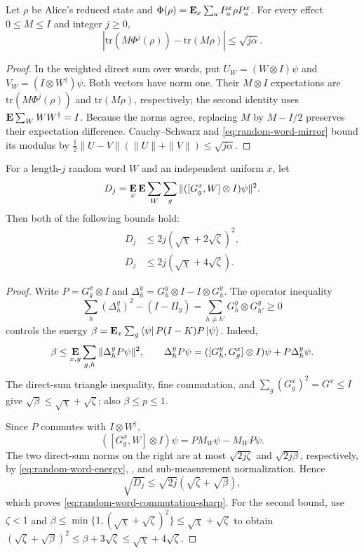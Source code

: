 \documentclass[11pt]{article}
\theoremstyle{definition}
\newcommand{\E}{\mathop{\bf E\/}}
\newcommand{\tr}{\mathrm{tr}} \newcommand{\Tr}{\tr}
\begin{document}
\begin{lemma}\label{lem:sequential-bot-marginal}
Let $\rho$ be Alice's reduced state and
$\Phi(\rho)=\E_x\sum_aP_a^x\rho P_a^x$.
For every effect $0\leq M\leq I$ and integer $j\geq0$,
\begin{equation}\label{eq:pasting-marginal-stability}
 |\tr(M\Phi^j(\rho))-\tr(M\rho)|\leq\sqrt{j\alpha}.
\end{equation}
\end{lemma}
\begin{proof}
In the weighted direct sum over words, put
$U_W=(W\otimes I)\psi$ and $V_W=(I\otimes W^\dagger)\psi$.
Both vectors have norm one.  Their $M\otimes I$ expectations are
$\tr(M\Phi^j(\rho))$ and $\tr(M\rho)$, respectively; the second
identity uses $\E\sum_WWW^\dagger=I$.
Because the norms agree, replacing $M$ by $M-I/2$ preserves their
expectation difference.  Cauchy--Schwarz and
\eqref{eq:random-word-mirror} bound its modulus by
$\tfrac12\|U-V\|(\|U\|+\|V\|)\leq\sqrt{j\alpha}$.
\end{proof}

\begin{lemma}\label{lem:commute-g-half-sandwich}
For a length-$j$ random word $W$ and an independent uniform $x$, let
\[
 D_j=\E_x\E\sum_W\sum_g
       \|([G_g^x,W]\otimes I)\psi\|^2.
\]
Then both of the following bounds hold:
\begin{align}
 D_j&\leq2j(\sqrt\chi+2\sqrt\zeta)^2,
       \label{eq:random-word-commutation-sharp}\\
 D_j&\leq2j(\sqrt\chi+4\sqrt\zeta).
       \label{eq:random-word-commutation}
\end{align}
\end{lemma}
\begin{proof}
Write $P=G_g^x\otimes I$ and $\Delta_h^y=G_h^y\otimes I-I\otimes G_h^y$.
The operator inequality
\[
 \sum_h(\Delta_h^y)^2-(I-\Pi_y)
 =\sum_{h\ne h'}G_h^y\otimes G_{h'}^y\geq0
\]
controls the energy
$\beta=\E_x\sum_g\bra\psi P(I-K)P\ket\psi$.
Indeed,
\[
 \beta\leq\E_{x,y}\sum_{g,h}\|\Delta_h^yP\psi\|^2,
 \qquad
 \Delta_h^yP\psi
 =([G_h^y,G_g^x]\otimes I)\psi+P\Delta_h^y\psi.
\]
The direct-sum triangle inequality, fine commutation, and
$\sum_g(G_g^x)^2=G^x\leq I$ give
$\sqrt\beta\leq\sqrt\chi+\sqrt\zeta$; also $\beta\leq p\leq1$.

Since $P$ commutes with $I\otimes W^\dagger$,
\[
 ([G_g^x,W]\otimes I)\psi=PM_W\psi-M_WP\psi.
\]
The two direct-sum norms on the right are at most
$\sqrt{2j\zeta}$ and $\sqrt{2j\beta}$, respectively, by
\eqref{eq:random-word-energy}, , and
sub-measurement normalization.  Hence
\[
 \sqrt{D_j}\leq\sqrt{2j}(\sqrt\zeta+\sqrt\beta),
\]
which proves \eqref{eq:random-word-commutation-sharp}.
For the second bound, use $\zeta<1$ and
$\beta\leq\min\{1,(\sqrt\chi+\sqrt\zeta)^2\}
\leq\sqrt\chi+\sqrt\zeta$ to obtain
$(\sqrt\zeta+\sqrt\beta)^2\leq\beta+3\sqrt\zeta
\leq\sqrt\chi+4\sqrt\zeta$.
\end{proof}
\end{document}
